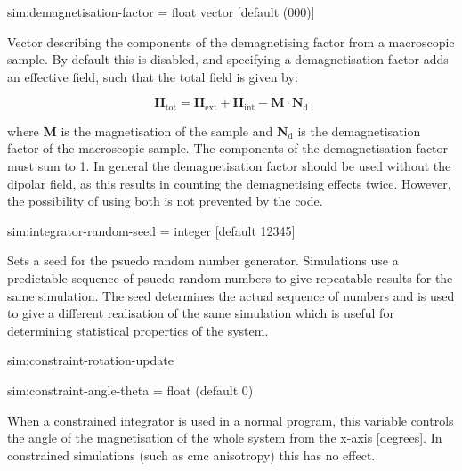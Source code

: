 {\zicf sim:demagnetisation-factor = float vector [default (000)]} Vector describing the components of the demagnetising factor from a macroscopic sample. By default this is disabled, and specifying a demagnetisation factor adds an effective field, such that the total field is given by:

\begin{equation*}
\mathbf{H}_{\mathrm{tot}} = \mathbf{H}_{\mathrm{ext}} + \mathbf{H}_{\mathrm{int}} - \mathbf{M} \cdot \mathbf{N}_{\mathrm{d}}
\end{equation*}

\noindent where $\mathbf{M}$ is the magnetisation of the sample and $\mathbf{N}_{\mathrm{d}}
$ is the demagnetisation factor of the macroscopic sample. The components of the demagnetisation factor must sum to 1. In general the demagnetisation factor should be used without the dipolar field, as this results in counting the demagnetising effects twice. However, the possibility of using both is not prevented by the code.



{\zicf sim:integrator-random-seed = integer [default 12345]} Sets a seed for the psuedo random number generator. Simulations use a predictable sequence of psuedo random numbers to give repeatable results for the same simulation. The seed determines the actual sequence of numbers and is used to give a different realisation of the same simulation which is useful for determining statistical properties of the system.

{\zicf sim:constraint-rotation-update}

{\zicf sim:constraint-angle-theta = float (default 0)} When a constrained integrator is used in a normal program, this variable controls the angle of the magnetisation of the whole system from the x-axis [degrees]. In constrained simulations (such as cmc anisotropy) this has no effect.

